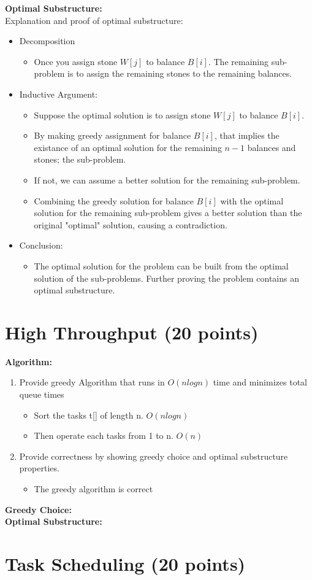 \documentclass{article}[12pt]
\begin{document}
\pagebreak
\noindent\textbf{Optimal Substructure:} \\
Explanation and proof of optimal substructure: \\
\begin{itemize}
  \item Decomposition
    \begin{itemize}
      \item Once you assign stone $W[j]$ to balance $B[i]$.
        The remaining sub-problem is to assign the remaining stones to the remaining balances.
    \end{itemize}
  \item Inductive Argument:
    \begin{itemize}
      \item Suppose the optimal solution is to assign stone $W[j]$ to balance $B[i]$.
      \item By making greedy assignment for balance $B[i]$, that implies
        the existance of an optimal solution for the remaining $n-1$ balances and stones; the sub-problem.
      \item If not, we can assume a better solution for the remaining sub-problem.
      \item Combining the greedy solution for balance $B[i]$ with the optimal solution for the remaining sub-problem
        gives a better solution than the original "optimal" solution, causing a contradiction.
    \end{itemize}
  \item Conclusion:
    \begin{itemize}
      \item The optimal solution for the problem can be built from the optimal solution of the sub-problems.
        Further proving the problem contains an optimal substructure.
    \end{itemize}
\end{itemize}

\newpage
\section{High Throughput (20 points)}
\noindent\textbf{Algorithm:} \\
\begin{enumerate}
  \item Provide greedy Algorithm that runs in $O(nlogn)$ time and minimizes total queue times
    \begin{itemize}
      \item Sort the tasks t[] of length n. $O(nlogn)$
      \item Then operate each tasks from 1 to n. $O(n)$
    \end{itemize}
  \item Provide correctness by showing greedy choice and optimal substructure properties.
    \begin{itemize}
      \item The greedy algorithm is correct
    \end{itemize}
\end{enumerate}

\noindent\textbf{Greedy Choice:} \\
\noindent\textbf{Optimal Substructure:} \\

\newpage
\section{Task Scheduling (20 points)}
\end{document}
